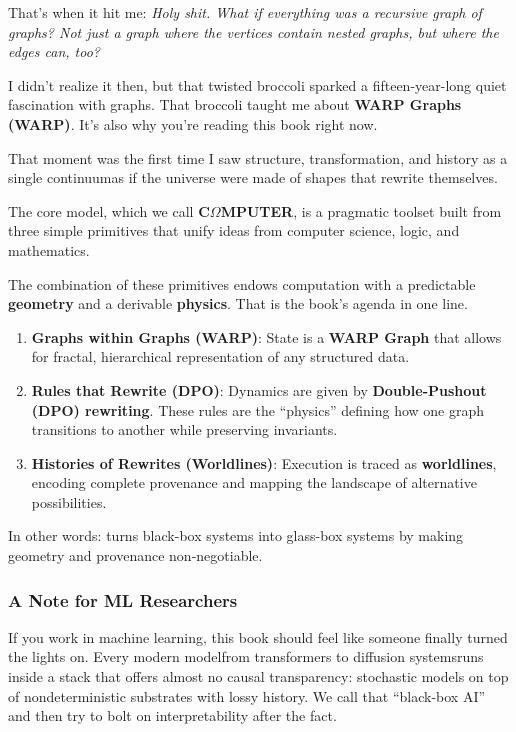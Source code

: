 That's when it hit me: \emph{Holy shit. What if everything was a recursive graph of graphs? Not just a graph where the vertices contain nested graphs, but where the edges can, too?}

I didn't realize it then, but that twisted broccoli sparked a fifteen-year-long quiet fascination with graphs. That broccoli taught me about \textbf{WARP Graphs (WARP)}. It's also why you're reading this book right now.

That moment was the first time I saw structure, transformation, and history as a single continuum\emd{}as if the universe were made of shapes that rewrite themselves.

The core model, which we call \textbf{C\texorpdfstring{\boldmath$\Omega$}{Omega}MPUTER}, is a pragmatic toolset built from three simple primitives that unify ideas from computer science, logic, and mathematics.



The combination of these primitives endows computation with a predictable \textbf{geometry} and a derivable \textbf{physics}. That is the book's agenda in one line.

\begin{enumerate}
    \item \textbf{Graphs within Graphs (WARP)}: State is a \textbf{WARP Graph} that allows for fractal, hierarchical representation of any structured data.
    \item \textbf{Rules that Rewrite (DPO)}: Dynamics are given by \textbf{Double-Pushout (DPO) rewriting}. These rules are the ``physics'' defining how one graph transitions to another while preserving invariants.
    \item \textbf{Histories of Rewrites (Worldlines)}: Execution is traced as \textbf{worldlines}, encoding complete provenance and mapping the landscape of alternative possibilities.
\end{enumerate}

\noindent
In other words: \COMPUTER{} turns black-box systems into glass-box systems by making geometry and provenance non-negotiable.

\subsubsection*{A Note for ML Researchers}
If you work in machine learning, this book should feel like someone finally turned the lights on. Every modern model\emd{}from transformers to diffusion systems\emd{}runs inside a stack that offers almost no causal transparency: stochastic models on top of nondeterministic substrates with lossy history. We call that ``black-box AI'' and then try to bolt on interpretability after the fact.

